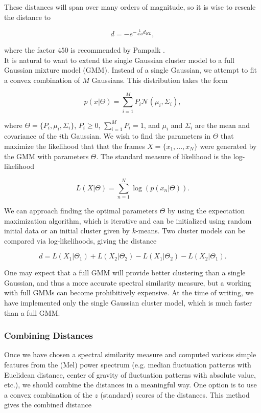 \documentclass[12pt]{article}
\begin{document}
\noindent These distances will span over many orders of magnitude, so it is wise to rescale the distance to

\[ d = -e^{-\frac{1}{450}d_{KL}}, \]

\noindent where the factor $450$ is recommended by Pampalk \cite{pampalk:dissertation}.\\

It is natural to want to extend the single Gaussian cluster model to a full Gaussian mixture model (GMM).  Instead of a single Gaussian, we attempt to fit a convex combination of $M$ Gaussians.  This distribution takes the form

\[ p(x|\Theta) = \sum_{i=1}^M P_i \mathcal{N}(\mu_i, \Sigma_i), \]

\noindent where $\Theta = \{P_i,\mu_i,\Sigma_i\}$, $P_i\ge 0$, $\sum_{i=1}^M P_i = 1$, and $\mu_i$ and $\Sigma_i$ are the mean and covariance of the $i$th Gaussian.  We wish to find the parameters in $\Theta$ that maximize the likelihood that that the frames $X = \{x_1,...,x_N\}$ were generated by the GMM with parameters $\Theta$.  The standard measure of likelihood is the log-likelihood

\[ L(X|\Theta) = \sum_{n=1}^N \log\left(p(x_n|\Theta)\right). \]

\noindent We can approach finding the optimal parameters $\Theta$ by using the expectation maximization algorithm, which is iterative and can be initialized using random initial data or an initial cluster given by $k$-means.  Two cluster models can be compared via log-likelihoods, giving the distance

\[ d = L(X_1|\Theta_1) + L(X_2|\Theta_2) - L(X_1|\Theta_2) - L(X_2|\Theta_1). \]

One may expect that a full GMM will provide better clustering than a single Gaussian, and thus a more accurate spectral similarity measure, but a working with full GMMs can become prohibitively expensive.  At the time of writing, we have implemented only the single Gaussian cluster model, which is much faster than a full GMM.\\

\subsubsection{Combining Distances}

Once we have chosen a spectral similarity measure and computed various simple features from the (Mel) power spectrum (e.g. median fluctuation patterns with Euclidean distance, center of gravity of fluctuation patterns with absolute value, etc.), we should combine the distances in a meaningful way.  One option is to use a convex combination of the $z$ (standard) scores of the distances.  This method gives the combined distance
\end{document}
